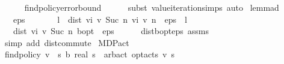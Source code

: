 \begin{isabellebody}
\ \ \ \ \isamarkupfalse%
\ find{\isacharunderscore}{\kern0pt}policy{\isacharunderscore}{\kern0pt}error{\isacharunderscore}{\kern0pt}bound\isanewline
\ \ \ \ \isamarkupfalse%
\ {\isacharparenleft}{\kern0pt}subst\ value{\isacharunderscore}{\kern0pt}iteration{\isachardot}{\kern0pt}simps{\isacharparenright}{\kern0pt}\ auto\isanewline
{}\isamarkupfalse%
%
\endisatagproof
{\isafoldproof}%
%
\isadelimproof
\isanewline
%
\endisadelimproof
\isanewline
{}\isamarkupfalse%
\ lemma{\isacharunderscore}{\kern0pt}{}{\isacharunderscore}{\kern0pt}{}{\isacharunderscore}{\kern0pt}{}{\isacharunderscore}{\kern0pt}d{\isacharcolon}{\kern0pt}\isanewline
\ \ \ {\isachardoublequoteopen}eps\ {\isachargreater}{\kern0pt}\ {}{\isachardoublequoteclose}\isanewline
\ \ \ {\isachardoublequoteopen}{}\ {\isacharasterisk}{\kern0pt}\ l\ {\isacharasterisk}{\kern0pt}\ dist\ {\isacharparenleft}{\kern0pt}vi\ v\ {\isacharparenleft}{\kern0pt}Suc\ n{\isacharparenright}{\kern0pt}{\isacharparenright}{\kern0pt}\ {\isacharparenleft}{\kern0pt}vi\ v\ n{\isacharparenright}{\kern0pt}\ {\isacharless}{\kern0pt}\ eps\ {\isacharasterisk}{\kern0pt}\ {\isacharparenleft}{\kern0pt}{}{\isacharminus}{\kern0pt}l{\isacharparenright}{\kern0pt}{\isachardoublequoteclose}\isanewline
\ \ \ {\isachardoublequoteopen}dist\ {\isacharparenleft}{\kern0pt}vi\ v\ {\isacharparenleft}{\kern0pt}Suc\ n{\isacharparenright}{\kern0pt}{\isacharparenright}{\kern0pt}\ {\isasymnu}\isactrlsub b{\isacharunderscore}{\kern0pt}opt\ {\isacharless}{\kern0pt}\ eps\ {\isacharslash}{\kern0pt}\ {}{\isachardoublequoteclose}\isanewline
%
\isadelimproof
\ \ %
\endisadelimproof
%
\isatagproof
{}\isamarkupfalse%
\ dist{\isacharunderscore}{\kern0pt}{\isasymL}\isactrlsub b{\isacharunderscore}{\kern0pt}opt{\isacharunderscore}{\kern0pt}eps\ assms\isanewline
\ \ \isamarkupfalse%
\ {\isacharparenleft}{\kern0pt}simp\ add{\isacharcolon}{\kern0pt}\ dist{\isacharunderscore}{\kern0pt}commute{\isacharparenright}{\kern0pt}%
\endisatagproof
{\isafoldproof}%
%
\isadelimproof
\isanewline
%
\endisadelimproof
\isanewline
{}\isamarkupfalse%
\isanewline
\isanewline
{}\isamarkupfalse%
\ MDP{\isacharunderscore}{\kern0pt}act\ \isanewline
\isanewline
{}\isamarkupfalse%
\ {\isachardoublequoteopen}find{\isacharunderscore}{\kern0pt}policy{\isacharprime}{\kern0pt}\ {\isacharparenleft}{\kern0pt}v\ {\isacharcolon}{\kern0pt}{\isacharcolon}{\kern0pt}\ {\isacharprime}{\kern0pt}s\ {\isasymRightarrow}\isactrlsub b\ real{\isacharparenright}{\kern0pt}\ s\ {\isacharequal}{\kern0pt}\ arb{\isacharunderscore}{\kern0pt}act\ {\isacharparenleft}{\kern0pt}opt{\isacharunderscore}{\kern0pt}acts\ v\ s{\isacharparenright}{\kern0pt}{\isachardoublequoteclose}\isanewline

\end{isabellebody}
